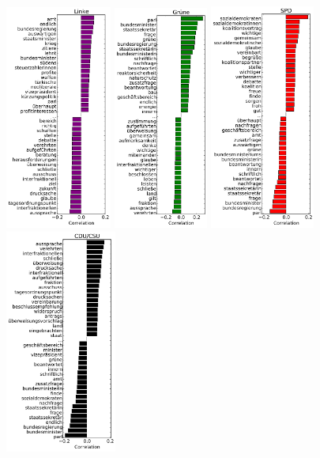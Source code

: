 \documentclass{article} %
\begin{document}
\begin{figure}
\begin{center}
\includegraphics[width=3.5cm]{party_word_correlations-linke.pdf} 
\includegraphics[width=3.1cm]{party_word_correlations-gruene.pdf} 
\includegraphics[width=3.45cm]{party_word_correlations-spd.pdf} 
\includegraphics[width=3.65cm]{party_word_correlations-cdu.pdf}

\end{center}
\end{figure}
\end{document}
